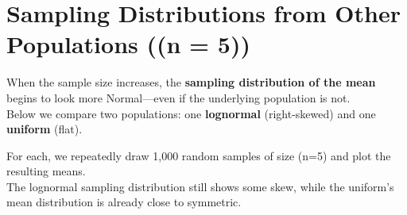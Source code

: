 \documentclass[
  letterpaper,
  DIV=11,
  numbers=noendperiod]{scrreprt}
\begin{document}
\section{Sampling Distributions from Other Populations ((n =
5))}\label{sampling-distributions-from-other-populations-n-5}

When the sample size increases, the \textbf{sampling distribution of the
mean} begins to look more Normal---even if the underlying population is
not.\\
Below we compare two populations: one \textbf{lognormal} (right-skewed)
and one \textbf{uniform} (flat).

For each, we repeatedly draw 1,000 random samples of size (n=5) and plot
the resulting means.\\
The lognormal sampling distribution still shows some skew, while the
uniform's mean distribution is already close to symmetric.
\end{document}
